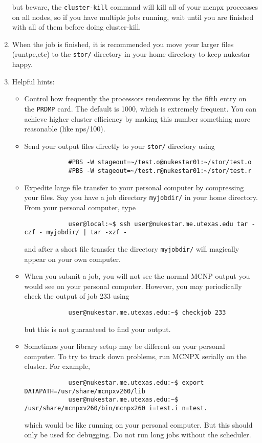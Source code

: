 \documentclass[a4paper, 12pt]{article}
\begin{document}
\begin{enumerate}
	but beware, the \verb+cluster-kill+ command will kill all of your mcnpx proccesses on all nodes, so if you have multiple jobs running, wait until you are finished with all of them before doing cluster-kill.
	\item When the job is finished, it is recommended you move your larger files (runtpe,etc) to the \verb+stor/+ directory in your home directory to keep nukestar happy.
	\item Helpful hints:
	{\small
	\begin{itemize}
		\item Control how frequently the processors rendezvous by the fifth entry on the \verb+PRDMP+ card. The default is 1000, which is extremely frequent. You can achieve higher cluster efficiency by making this number something more reasonable (like nps/100).
		\item Send your output files directly to your \verb+stor/+ directory using
		\begin{verbatim}
			#PBS -W stageout=~/test.o@nukestar01:~/stor/test.o
			#PBS -W stageout=~/test.r@nukestar01:~/stor/test.r
		\end{verbatim}
		\item Expedite large file transfer to your personal computer by compressing your files. Say you have a job directory \verb+myjobdir/+ in your home directory. From your personal computer, type
		\begin{verbatim}
			user@local:~$ ssh user@nukestar.me.utexas.edu tar -czf - myjobdir/ | tar -xzf -
		\end{verbatim}
		and after a short file transfer the directory \verb+myjobdir/+ will magically appear on your own computer.
		\item When you submit a job, you will not see the normal MCNP output you would see on your personal computer. However, you may periodically check the output of job 233 using
		\begin{verbatim}
			user@nukestar.me.utexas.edu:~$ checkjob 233
		\end{verbatim}
		but this is not guaranteed to find your output.
		\item Sometimes your library setup may be different on your personal computer. To try to track down problems, run MCNPX serially on the cluster. For example,
		\begin{verbatim}
			user@nukestar.me.utexas.edu:~$ export DATAPATH=/usr/share/mcnpxv260/lib
			user@nukestar.me.utexas.edu:~$ /usr/share/mcnpxv260/bin/mcnpx260 i=test.i n=test. 
		\end{verbatim}
		which would be like running on your personal computer. But this should only be used for debugging. Do not run long jobs without the scheduler.
	\end{itemize}
	}
\end{enumerate}
\end{document}
